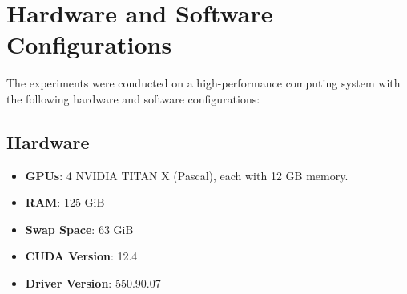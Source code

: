 

\section{Hardware and Software Configurations}
\label{sec:hardware_software}
The experiments were conducted on a high-performance computing system with the following hardware and software configurations:

\subsection{Hardware}
\begin{itemize}
    \item \textbf{GPUs}: 4 NVIDIA TITAN X (Pascal), each with 12 GB memory.
    \item \textbf{RAM}: 125 GiB
    \item \textbf{Swap Space}: 63 GiB
    \item \textbf{CUDA Version}: 12.4
    \item \textbf{Driver Version}: 550.90.07
\end{itemize}

